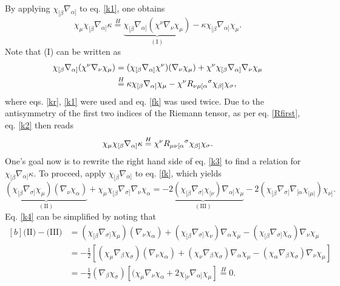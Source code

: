 \documentclass[
12pt,		%
openright,	%
twoside,  %
a4paper,			%
chapter=TITLE,		%
english,			%
french,				%
spanish,			%
brazil				%
]{USPSC-classe/USPSC}
\begin{document}
 By applying $\chi_{[\beta}\nabla_{\alpha]}$ to eq. \ref{k1}, one obtains
 \begin{equation}\label{k2}
     \chi_{\mu}\chi_{[\beta}\nabla_{\alpha]}\kappa\overset{H}{=}\underbrace{\chi_{[\beta}\nabla_{\alpha]}(\chi^{\nu}\nabla_{\nu}\chi_{\mu})}_{(\text{I})}-\kappa\chi_{[\beta}\nabla_{\alpha]}\chi_{\mu}.
 \end{equation}
 Note that (I) can be written as
 \begin{equation}
 \begin{aligned}[b]
     \chi_{[\beta}\nabla_{\alpha]}(\chi^{\nu}\nabla_{\nu}\chi_{\mu}) & =(\chi_{[\beta}\nabla_{\alpha]}\chi^{\nu})(\nabla_{\nu}\chi_{\mu})+\chi^{\nu}\chi_{[\beta}\nabla_{\alpha]}\nabla_{\nu}\chi_{\mu}\\
     & \overset{H}{=} \kappa\chi_{[\beta}\nabla_{\alpha]}\chi_{\mu}-\chi^{\nu}R_{\nu\mu[\alpha}\mathstrut^{\sigma}\chi_{\beta]}\chi_{\sigma}, 
\end{aligned}
 \end{equation}
 where eqs. \ref{kr}, \ref{k1} were used and eq. \ref{fk} was used twice. Due to the antisymmetry of the first two indices of the Riemann tensor, as per eq. \ref{Rfirst}, eq. \ref{k2} then reads
 \begin{equation}\label{k3}
     \chi_{\mu}\chi_{[\beta}\nabla_{\alpha]}\kappa\overset{H}{=}\chi^{\nu}R_{\mu\nu[\alpha}\mathstrut^{\sigma}\chi_{\beta]}\chi_{\sigma}.
 \end{equation}
One's goal now is to rewrite the right hand side of eq. \ref{k3} to find a relation for $\chi_{[\beta}\nabla_{\alpha]}\kappa$. To proceed, apply $\chi_{[\beta}\nabla_{\alpha]}$ to eq. \ref{fk}, which yields
\begin{equation}\label{k4}
    \underbrace{(\chi_{[\beta}\nabla_{\sigma]}\chi_\mu)(\nabla_{\nu}\chi_{\alpha})}_{(\text{II})}+\chi_{\mu}\chi_{[\beta}\nabla_{\sigma]}\nabla_{\nu}\chi_{\alpha}=\underbrace{-2(\chi_{[\beta}\nabla_{\sigma]}\chi_{[\nu})\nabla_{\alpha]}\chi_{\mu}}_{(\text{III})}-2(\chi_{[\beta}\nabla_{\sigma]}\nabla_{[\alpha}\chi_{|\mu|})\chi_{\nu]}.
\end{equation}
Eq. \ref{k4} can be simplified by noting that
\begin{equation}
\begin{aligned}[b]
    \text{(II)}-\text{(III)} & =(\chi_{[\beta}\nabla_{\sigma]}\chi_\mu)(\nabla_{\nu}\chi_{\alpha})+(\chi_{[\beta}\nabla_{\sigma]}\chi_{\nu})\nabla_{\alpha}\chi_{\mu}-(\chi_{[\beta}\nabla_{\sigma]}\chi_{\alpha})\nabla_{\nu}\chi_{\mu}\\
               & = -\frac{1}{2}[(\chi_{\mu}\nabla_{\beta}\chi_\sigma)(\nabla_{\nu}\chi_{\alpha})+(\chi_{\nu}\nabla_{\beta}\chi_{\sigma})\nabla_{\alpha}\chi_{\mu}-(\chi_{\alpha}\nabla_{\beta}\chi_{\sigma})\nabla_{\nu}\chi_{\mu}]\\   
               & = -\frac{1}{2}(\nabla_{\beta}\chi_\sigma)[(\chi_{\mu}\nabla_{\nu}\chi_{\alpha}+2\chi_{[\nu}\nabla_{\alpha]}\chi_{\mu}]\overset{H}{=}0.
\end{aligned}   
\end{equation}
\end{document}
